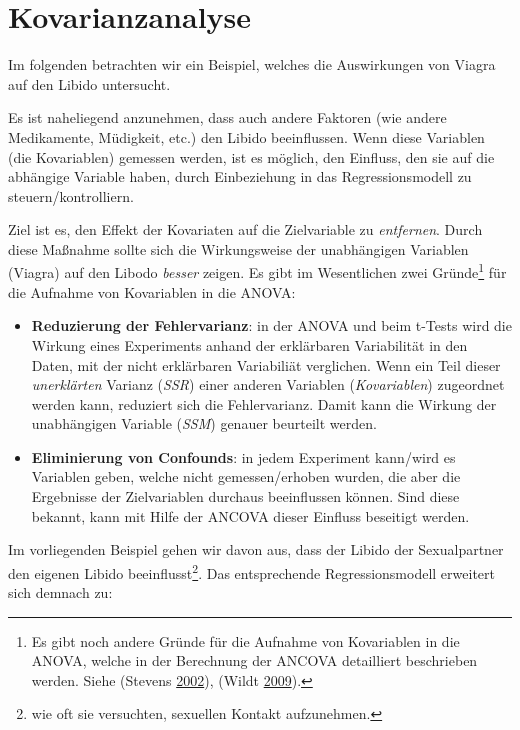 \documentclass[]{article}
\let\rmarkdownfootnote\footnote%
\def\footnote{\protect\rmarkdownfootnote}
\begin{document}
\hypertarget{kovarianzanalyse}{%
\section*{Kovarianzanalyse}\label{kovarianzanalyse}}

Im folgenden betrachten wir ein Beispiel, welches die Auswirkungen von Viagra auf den Libido untersucht.

Es ist naheliegend anzunehmen, dass auch andere Faktoren (wie andere Medikamente, Müdigkeit, etc.) den Libido beeinflussen. Wenn diese Variablen (die Kovariablen) gemessen werden, ist es möglich, den Einfluss, den sie auf die abhängige Variable haben, durch Einbeziehung in das Regressionsmodell zu steuern/kontrolliern.

Ziel ist es, den Effekt der Kovariaten auf die Zielvariable zu \emph{entfernen}. Durch diese Maßnahme sollte sich die Wirkungsweise der unabhängigen Variablen (Viagra) auf den Libodo \emph{besser} zeigen. Es gibt im Wesentlichen zwei Gründe\footnote{Es gibt noch andere Gründe für die Aufnahme von Kovariablen in die ANOVA, welche in der Berechnung der ANCOVA detailliert beschrieben werden. Siehe (Stevens \protect\hyperlink{ref-Stevens.2002}{2002}), (Wildt \protect\hyperlink{ref-Wildt.2009}{2009}).} für die Aufnahme von Kovariablen in die ANOVA:

\begin{itemize}
\item
  \textbf{Reduzierung der Fehlervarianz}: in der ANOVA und beim t-Tests wird die Wirkung eines Experiments anhand der erklärbaren Variabilität in den Daten, mit der nicht erklärbaren Variabiliät verglichen. Wenn ein Teil dieser \emph{unerklärten} Varianz (\emph{SSR}) einer anderen Variablen (\emph{Kovariablen}) zugeordnet werden kann, reduziert sich die Fehlervarianz. Damit kann die Wirkung der unabhängigen Variable (\emph{SSM}) genauer beurteilt werden.
\item
  \textbf{Eliminierung von Confounds}: in jedem Experiment kann/wird es Variablen geben, welche nicht gemessen/erhoben wurden, die aber die Ergebnisse der Zielvariablen durchaus beeinflussen können. Sind diese bekannt, kann mit Hilfe der ANCOVA dieser Einfluss beseitigt werden.
\end{itemize}

Im vorliegenden Beispiel gehen wir davon aus, dass der Libido der Sexualpartner den eigenen Libido beeinflusst\footnote{wie oft sie versuchten, sexuellen Kontakt aufzunehmen.}. Das entsprechende Regressionsmodell erweitert sich demnach zu:
\end{document}
